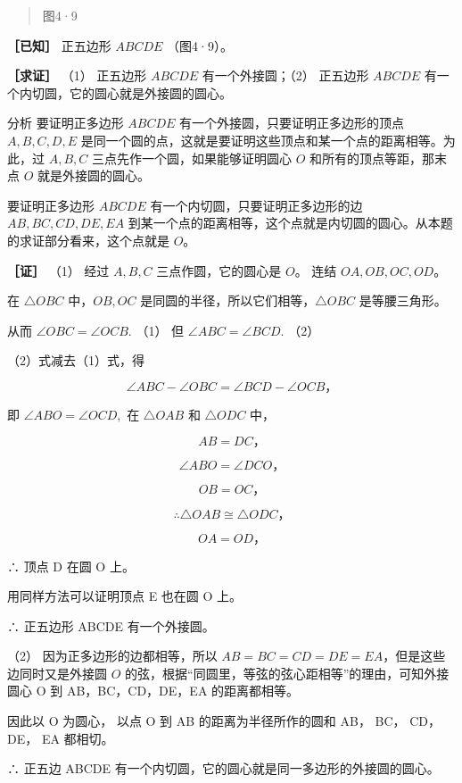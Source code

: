 \begin{quote}
图4·9
\end{quote}

\textbf{［已知］} 正五边形 \(ABCDE\) （图4·9）。

\textbf{［求证］} （1） 正五边形 \(ABCDE\) 有一个外接圆；（2） 正五边形
\(ABCDE\) 有一个内切圆，它的圆心就是外接圆的圆心。

分析 要证明正多边形 \(ABCDE\) 有一个外接圆，只要证明正多边形的顶点
\(A, B, C, D, E\)
是同一个圆的点，这就是要证明这些顶点和某一个点的距离相等。为此，过
\(A, B, C\) 三点先作一个圆，如果能够证明圆心 \(O\)
和所有的顶点等距，那末点 \(O\) 就是外接圆的圆心。

要证明正多边形 \(ABCDE\) 有一个内切圆，只要证明正多边形的边
\(AB, BC, CD, DE, EA\)
到某一个点的距离相等，这个点就是内切圆的圆心。从本题的求证部分看来，这个点就是
\(O\)。

\textbf{［证］} （1） 经过 \(A, B, C\) 三点作圆，它的圆心是 \(O\)。 连结
\(OA, OB, OC, OD\)。

在 \(\triangle OBC\) 中，\(OB, OC\)
是同圆的半径，所以它们相等，\(\triangle OBC\) 是等腰三角形。

从而 \(\angle OBC = \angle OCB.\) （1） 但 \(\angle ABC = \angle BCD.\)
（2）

（2）式减去（1）式，得

\[
\angle A B C - \angle O B C = \angle B C D - \angle O C B\text{，}
\]

即 \(\angle ABO = \angle OCD,\) 在 \(\triangle OAB\) 和
\(\triangle ODC\) 中，

\[
A B = D C\text{，}
\]

\[
\angle A B O = \angle D C O\text{，}
\]

\[
O B = O C\text{，}
\]

\[
\therefore \triangle O A B \cong \triangle O D C\text{，}
\]

\[
O A = O D\text{，}
\]

∴ 顶点 D 在圆 O 上。

用同样方法可以证明顶点 E 也在圆 O 上。

∴ 正五边形 ABCDE 有一个外接圆。

（2） 因为正多边形的边都相等，所以
\(AB = BC = CD = DE = EA\)，但是这些边同时又是外接圆 \(O\)
的弦，根据``同圆里，等弦的弦心距相等''的理由，可知外接圆心 O 到
AB，BC，CD，DE，EA 的距离都相等。

因此以 O 为圆心， 以点 O 到 AB 的距离为半径所作的圆和 AB， BC， CD，
DE， EA 都相切。

∴ 正五边 ABCDE 有一个内切圆，它的圆心就是同一多边形的外接圆的圆心。

